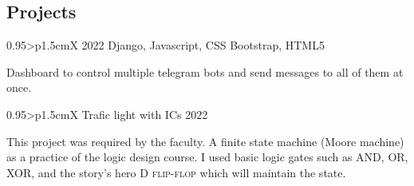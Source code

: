 \documentclass[a4paper, oneside, final]{scrartcl} %
\begin{document}
\begin{center}
\section{Projects}
 



\begin{paracol}{2}


\begin{tabularx}{0.95\linewidth}{>{\raggedleft\scshape}p{1.5cm}X}
 {}
 {2022}
 {Django, Javascript, CSS Bootstrap, HTML5}
\end{tabularx}

\vspace{2mm}
\parbox{0.95\linewidth}{%
Dashboard to control multiple telegram bots and send messages to all of them at once.
}%

\vspace{20pt}

\begin{tabularx}{0.95\linewidth}{>{\raggedleft\scshape}p{1.5cm}X}
 {Trafic light with ICs}
 {2022}
\end{tabularx}

\vspace{2mm}
\parbox{0.95\linewidth}{%
This project was required by the faculty. A finite state machine (Moore machine) as a practice of the logic design course. I used basic logic gates such as \textsc{AND}, \textsc{OR}, \textsc{XOR}, and the story's hero \textsc{D flip-flop} which will maintain the state.
}%

\vspace{20pt}


\end{paracol}
\end{center}
\end{document}

